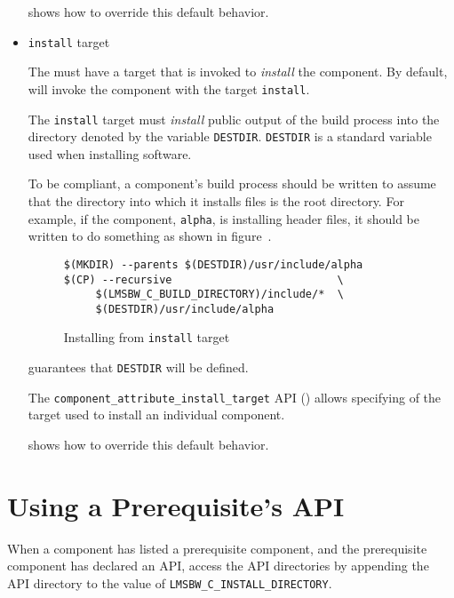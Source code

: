 \begin{itemize}
   shows how to override this
  default behavior.

\item \texttt{install} target

  The \makefile must have a target that is invoked to \emph{install}
  the component.  By default, \lmsbw will invoke the component
  \makefile with the target \texttt{install}.

  The \texttt{install} target must \emph{install} public output of the
  build process into the directory denoted by the \makefile variable
  \texttt{DESTDIR}.  \texttt{DESTDIR} is a standard \make variable
  used when installing software.

  To be compliant, a component's build process should be written to
  assume that the directory into which it installs files is the root
  directory.  For example, if the component, \texttt{alpha}, is
  installing header files, it should be written to do something as
  shown in figure~.

\begin{figure}
\hrulefill
\begin{verbatim}
$(MKDIR) --parents $(DESTDIR)/usr/include/alpha
$(CP) --recursive                          \
     $(LMSBW_C_BUILD_DIRECTORY)/include/*  \
     $(DESTDIR)/usr/include/alpha
\end{verbatim}
\hrulefill
\caption{Installing from \texttt{install} target}\label{wrap:install-target}
\end{figure}

  \lmsbw guarantees that \texttt{DESTDIR} will be defined.

  The \texttt{component\_attribute\_install\_target} API
  () allows specifying of
  the target used to install an individual component.

   shows how to override this
  default behavior.

\end{itemize}

\section{Using a Prerequisite's API}\label{wrap:using-prerequisite-api}

When a component has listed a prerequisite component, and the
prerequisite component has declared an API, access the API directories
by appending the API directory to the value of
\texttt{LMSBW\_C\_INSTALL\_DIRECTORY}.


